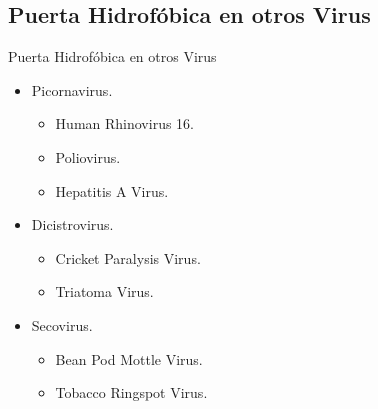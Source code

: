 \documentclass[8pt]{beamer}
\begin{document}
\subsection{Puerta Hidrofóbica en otros Virus}
\begin{frame}{Puerta Hidrofóbica en otros Virus}
\hspace{-0.7cm}
\begin{minipage}[t]{0.4\textwidth}
\begin{itemize}
    \item<1-> Picornavirus.
    \begin{itemize}
    \item<1-> Human Rhinovirus 16.
    \item<2-> Poliovirus.
    \item<3-> Hepatitis A Virus.
    \end{itemize}
    \item<4-> Dicistrovirus.
    \begin{itemize}
    \item<4-> Cricket Paralysis Virus.
    \item<4-> Triatoma Virus.
    \end{itemize}
    \item<5-> Secovirus.
    \begin{itemize}
    \item<5-> Bean Pod Mottle Virus.
    \item<6-> Tobacco Ringspot Virus.
    \end{itemize}
\end{itemize}
\end{minipage}
\begin{minipage}[t]{0.6\textwidth}
\end{minipage}
\end{frame}
\end{document}
